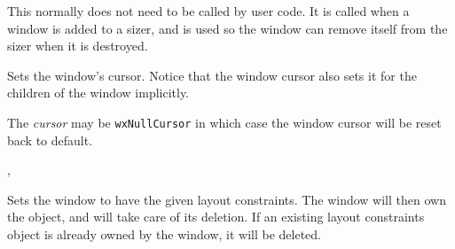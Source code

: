 




\label{wxwindowsetcontainingsizer}


This normally does not need to be called by user code.  It is called
when a window is added to a sizer, and is used so the window can
remove itself from the sizer when it is destroyed.


\label{wxwindowsetcursor}


Sets the window's cursor. Notice that the window cursor also sets it for the
children of the window implicitly.

The {\it cursor} may be {\tt wxNullCursor} in which case the window cursor will
be reset back to default.




, 


\label{wxwindowsetconstraints}


Sets the window to have the given layout constraints. The window
will then own the object, and will take care of its deletion.
If an existing layout constraints object is already owned by the
window, it will be deleted.


